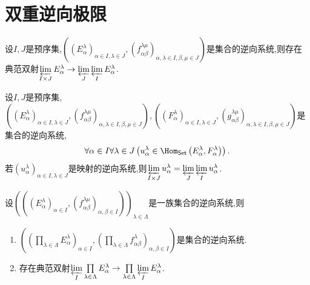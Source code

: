 \section{双重逆向极限}

\begin{proposition}{}{}
	设$I,J$是预序集,$\left(\left(E_{\alpha}^{\lambda}\right)_{\alpha\in I,\lambda\in J},\left(f_{\alpha\beta}^{\lambda\mu}\right)_{\alpha,\lambda\in I,\beta,\mu\in J}\right)$是集合的逆向系统,则存在典范双射$\varprojlim\limits_{I\times J}E_{\alpha}^{\lambda}\to\varprojlim\limits_{J}\varprojlim\limits_{I}E_{\alpha}^{\lambda}$.
\end{proposition}

\begin{corollary}{}{}
	设$I,J$是预序集,$\left(\left(E_{\alpha}^{\lambda}\right)_{\alpha\in I,\lambda\in J},\left(f_{\alpha\beta}^{\lambda\mu}\right)_{\alpha,\lambda\in I,\beta,\mu\in J}\right),\left(\left(F_{\alpha}^{\lambda}\right)_{\alpha\in I,\lambda\in J},\left(g_{\alpha\beta}^{\lambda\mu}\right)_{\alpha,\lambda\in I,\beta,\mu\in J}\right)$是集合的逆向系统,
	\begin{align*}
		\forall\alpha\in I\forall\lambda\in J\left(u_{\alpha}^{\lambda}\in\Hom_{\mathsf{Set}}\left(E_{\alpha}^{\lambda},F_{\alpha}^{\lambda}\right)\right).
	\end{align*}
	若$\left(u_{\alpha}^{\lambda}\right)_{\alpha\in I,\lambda\in J}$是映射的逆向系统,则$\varprojlim\limits_{I\times J}u_{\alpha}^{\lambda}=\varprojlim\limits_{J}\varprojlim\limits_{I}u_{\alpha}^{\lambda}$.
\end{corollary}

\begin{corollary}{}{}
	设$\left(\left(\left(E_{\alpha}^{\lambda}\right)_{\alpha\in I},\left(f_{\alpha\beta}^{\lambda\mu}\right)_{\alpha,\beta\in I}\right)\right)_{\lambda\in\Lambda}$是一族集合的逆向系统,则
	\begin{enumerate}
		\item $\left(\left(\prod\limits_{\lambda\in\Lambda}E_{\alpha}^{\lambda}\right)_{\alpha\in I},\left(\prod\limits_{\lambda\in\Lambda}f_{\alpha\beta}^{\lambda}\right)_{\alpha,\beta\in I}\right)$是集合的逆向系统.
		\item 存在典范双射$\varprojlim\limits_{I}\prod\limits_{\lambda\in\Lambda}E_{\alpha}^{\lambda}\to\prod\limits_{\lambda\in\Lambda}\varprojlim\limits_{I}E_{\alpha}^{\lambda}$.
	\end{enumerate}
\end{corollary}














